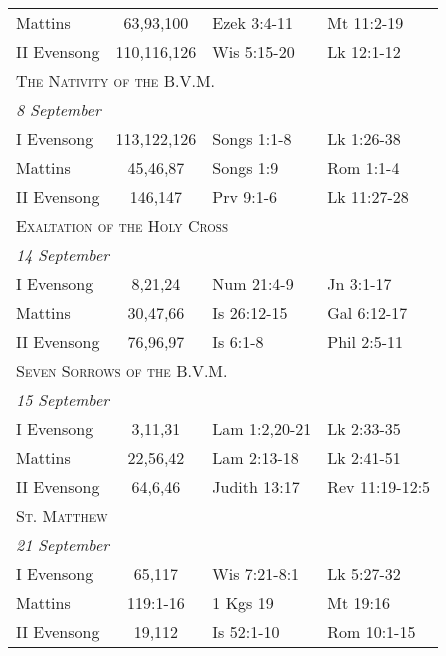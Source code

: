 \begin{longtable}{l c l l}
\hspace{1em} Mattins&63,93,100&Ezek 3:4-11&Mt 11:2-19\\
\hspace{1em} II Evensong&110,116,126&Wis 5:15-20&Lk 12:1-12\\
%
\multicolumn{4}{l}{\textsc{The Nativity of the B.V.M.}}\\
\multicolumn{4}{l}{\textit{8 September}}\\
\hspace{1em} I Evensong&113,122,126&Songs 1:1-8&Lk 1:26-38\\
\hspace{1em} Mattins&45,46,87&Songs 1:9&Rom 1:1-4\\
\hspace{1em} II Evensong&146,147&Prv 9:1-6&Lk 11:27-28\\
%
\multicolumn{4}{l}{\textsc{Exaltation of the Holy Cross}}\\
\multicolumn{4}{l}{\textit{14 September}}\\
\hspace{1em} I Evensong&8,21,24&Num 21:4-9&Jn 3:1-17\\
\hspace{1em} Mattins&30,47,66&Is 26:12-15&Gal 6:12-17\\
\hspace{1em} II Evensong&76,96,97&Is 6:1-8&Phil 2:5-11\\
%
\multicolumn{4}{l}{\textsc{Seven Sorrows of the B.V.M.}}\\
\multicolumn{4}{l}{\textit{15 September}}\\
\hspace{1em} I Evensong&3,11,31&Lam 1:2,20-21&Lk 2:33-35\\
\hspace{1em} Mattins&22,56,42&Lam 2:13-18&Lk 2:41-51\\
\hspace{1em} II Evensong&64,6,46&Judith 13:17&Rev 11:19-12:5\\
\multicolumn{4}{l}{\textsc{St. Matthew}}\\
\multicolumn{4}{l}{\textit{21 September}}\\
\hspace{1em} I Evensong&65,117&Wis 7:21-8:1&Lk 5:27-32\\
\hspace{1em} Mattins&119:1-16&1 Kgs 19&Mt 19:16\\
\hspace{1em} II Evensong&19,112&Is 52:1-10&Rom 10:1-15\\

\end{longtable}
